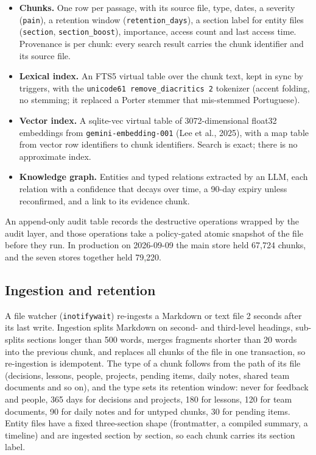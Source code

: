 \documentclass[a4paper,fleqn]{cas-sc}
\providecommand{\tightlist}{\setlength{\itemsep}{0pt}\setlength{\parskip}{0pt}}
\begin{document}
\begin{itemize}
\tightlist
\item
  \textbf{Chunks.} One row per passage, with its source file, type, dates, a severity (\texttt{pain}), a retention window (\texttt{retention\_days}), a section label for entity files (\texttt{section}, \texttt{section\_boost}), importance, access count and last access time. Provenance is per chunk: every search result carries the chunk identifier and its source file.
\item
  \textbf{Lexical index.} An FTS5 virtual table over the chunk text, kept in sync by triggers, with the \texttt{unicode61\ remove\_diacritics\ 2} tokenizer (accent folding, no stemming; it replaced a Porter stemmer that mis-stemmed Portuguese).
\item
  \textbf{Vector index.} A sqlite-vec virtual table of 3072-dimensional float32 embeddings from \texttt{gemini-embedding-001} (Lee et al., 2025), with a map table from vector row identifiers to chunk identifiers. Search is exact; there is no approximate index.
\item
  \textbf{Knowledge graph.} Entities and typed relations extracted by an LLM, each relation with a confidence that decays over time, a 90-day expiry unless reconfirmed, and a link to its evidence chunk.
\end{itemize}

An append-only audit table records the destructive operations wrapped by the audit layer, and those operations take a policy-gated atomic snapshot of the file before they run. In production on 2026-09-09 the main store held 67,724 chunks, and the seven stores together held 79,220.

\subsection{Ingestion and retention}

A file watcher (\texttt{inotifywait}) re-ingests a Markdown or text file 2 seconds after its last write. Ingestion splits Markdown on second- and third-level headings, sub-splits sections longer than 500 words, merges fragments shorter than 20 words into the previous chunk, and replaces all chunks of the file in one transaction, so re-ingestion is idempotent. The type of a chunk follows from the path of its file (decisions, lessons, people, projects, pending items, daily notes, shared team documents and so on), and the type sets its retention window: never for feedback and people, 365 days for decisions and projects, 180 for lessons, 120 for team documents, 90 for daily notes and for untyped chunks, 30 for pending items. Entity files have a fixed three-section shape (frontmatter, a compiled summary, a timeline) and are ingested section by section, so each chunk carries its section label.
\end{document}
